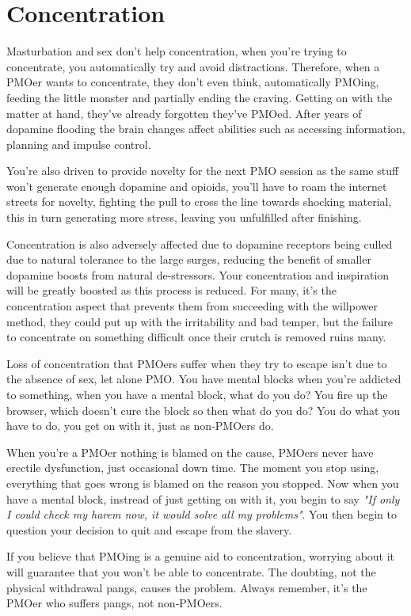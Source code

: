 \documentclass[easypeasy.tex]{subfiles}
\begin{document}
\section{Concentration}

Masturbation and sex don't help concentration, when you're trying to concentrate, you automatically try and avoid distractions. Therefore, when a PMOer wants to concentrate, they don't even think, automatically PMOing, feeding the little monster and partially ending the craving. Getting on with the matter at hand, they've already forgotten they've PMOed. After years of dopamine flooding the brain changes affect abilities such as accessing information, planning and impulse control.

You're also driven to provide novelty for the next PMO session as the same stuff won't generate enough dopamine and opioids, you'll have to roam the internet streets for novelty, fighting the pull to cross the line towards shocking material, this in turn generating more stress, leaving you unfulfilled after finishing.

Concentration is also adversely affected due to dopamine receptors being culled due to natural tolerance to the large surges, reducing the benefit of smaller dopamine boosts from natural de-stressors. Your concentration and inspiration will be greatly boosted as this process is reduced. For many, it's the concentration aspect that prevents them from succeeding with the willpower method, they could put up with the irritability and bad temper, but the failure to concentrate on something difficult once their crutch is removed ruins many.

Loss of concentration that PMOers suffer when they try to escape isn't due to the absence of sex, let alone PMO. You have mental blocks when you're addicted to something, when you have a mental block, what do you do? You fire up the browser, which doesn't cure the block so then what do you do? You do what you have to do, you get on with it, just as non-PMOers do.

When you're a PMOer nothing is blamed on the cause, PMOers never have erectile dysfunction, just occasional down time. The moment you stop using, everything that goes wrong is blamed on the reason you stopped. Now when you have a mental block, instread of just getting on with it, you begin to say \textit{"If only I could check my harem now, it would solve all my problems"}. You then begin to question your decision to quit and escape from the slavery.

If you believe that PMOing is a genuine aid to concentration, worrying about it will guarantee that you won't be able to concentrate. The doubting, not the physical withdrawal pangs, causes the problem. Always remember, it's the PMOer who suffers pangs, not non-PMOers.
\end{document}
